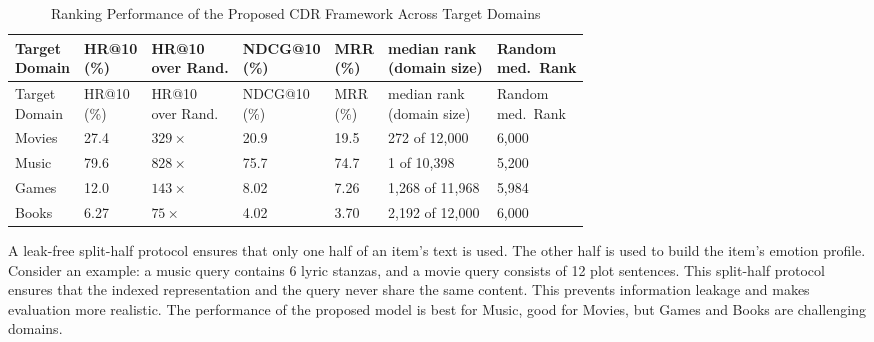 \setlength{\tabcolsep}{4pt}
{\footnotesize
\begin{longtable}{|p{1.5cm}|p{1.4cm}|p{1.4cm}|p{1.4cm}|p{1.4cm}|p{1.8cm}|p{1.4cm}|}
\caption{Ranking Performance of the Proposed CDR Framework Across Target Domains}
\label{tab:ch5_t2} \\
\hline
\makecell{Target \\ Domain} & \makecell{HR@10 \\ (\%)} & \makecell{HR@10 \\ over Rand.} & \makecell{NDCG@10 \\ (\%)} & \makecell{MRR \\ (\%)} & \makecell{median rank \\ (domain size)} & \makecell{Random \\ med.\ Rank} \\
\hline
\endfirsthead
\hline
\makecell{Target \\ Domain} & \makecell{HR@10 \\ (\%)} & \makecell{HR@10 \\ over Rand.} & \makecell{NDCG@10 \\ (\%)} & \makecell{MRR \\ (\%)} & \makecell{median rank \\ (domain size)} & \makecell{Random \\ med.\ Rank} \\
\hline
\endhead
\hline
\endfoot
Movies & 27.4 & $329\times$ & 20.9 & 19.5 & 272 of 12,000 & 6,000 \\
\hline
Music & 79.6 & $828\times$ & 75.7 & 74.7 & 1 of 10,398 & 5,200 \\
\hline
Games & 12.0 & $143\times$ & 8.02 & 7.26 & 1,268 of 11,968 & 5,984 \\
\hline
Books & 6.27 & $75\times$ & 4.02 & 3.70 & 2,192 of 12,000 & 6,000 \\
\hline
\end{longtable}
\setlength{\tabcolsep}{6pt}
} %

A leak-free split-half protocol ensures that only one half of an item’s text is used. The other half is used to build the item’s emotion profile. Consider an example: a music query contains 6 lyric stanzas, and a movie query consists of 12 plot sentences. This split-half protocol ensures that the indexed representation and the query never share the same content. This prevents information leakage and makes evaluation more realistic. The performance of the proposed model is best for Music, good for Movies, but Games and Books are challenging domains.

